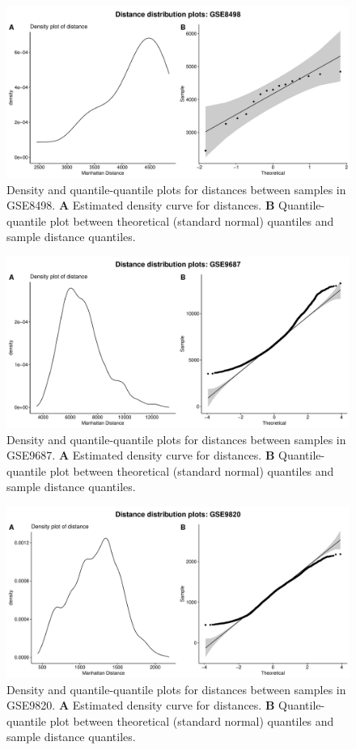 \documentclass[10pt,letterpaper]{article}\usepackage[]{graphicx}\usepackage[]{color}
\begin{document}
\begin{figure}[H]
	\includegraphics[width=\textwidth]{manhattan-distance_hist_GSE8498.pdf}
	\caption{Density and quantile-quantile plots for distances between samples in GSE8498. \textbf{A} Estimated density curve for distances. \textbf{B} Quantile-quantile plot between theoretical (standard normal) quantiles and sample distance quantiles.}
\end{figure}

\begin{figure}[H]
	\includegraphics[width=\textwidth]{manhattan-distance_hist_GSE9687.pdf}
	\caption{Density and quantile-quantile plots for distances between samples in GSE9687. \textbf{A} Estimated density curve for distances. \textbf{B} Quantile-quantile plot between theoretical (standard normal) quantiles and sample distance quantiles.}
\end{figure}

\begin{figure}[H]
	\includegraphics[width=\textwidth]{manhattan-distance_hist_GSE9820.pdf}
	\caption{Density and quantile-quantile plots for distances between samples in GSE9820. \textbf{A} Estimated density curve for distances. \textbf{B} Quantile-quantile plot between theoretical (standard normal) quantiles and sample distance quantiles.}
\end{figure}
\end{document}
